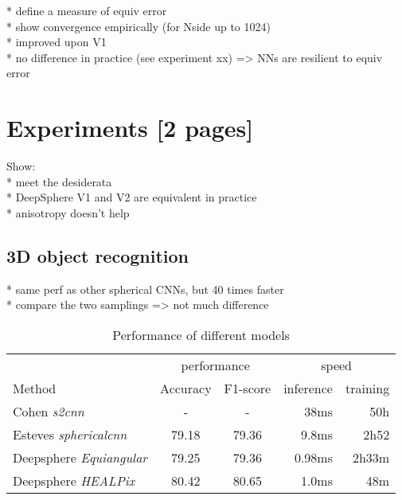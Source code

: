 \documentclass{article} %
\begin{document}
* define a measure of equiv error\\
* show convergence empirically (for Nside up to 1024) \\
* improved upon V1\\
* no difference in practice (see experiment xx) => NNs are resilient to equiv error\\

\section{Experiments [2 pages]}

Show: \\
* meet the desiderata \\
* DeepSphere V1 and V2 are equivalent in practice \\
* anisotropy doesn't help \\

\subsection{3D object recognition}

* same perf as other spherical CNNs, but 40 times faster \\
* compare the two samplings => not much difference \\

\begin{table}[ht]
    \centering
    \begin{tabular}{l|c c r r}
        \multicolumn{1}{l}{} & \multicolumn{2}{c}{performance} & \multicolumn{2}{c}{speed}\\
        \cmidrule(lr){2-3} \cmidrule(lr){5-6}
        \multicolumn{1}{l}{Method} & Accuracy & F1-score & inference & training \\ \hline
        Cohen \emph{s2cnn} & - & - & 38ms & 50h\\
        Esteves \emph{sphericalcnn} & 79.18 & 79.36 & 9.8ms & 2h52\\ \hline
        Deepsphere \emph{Equiangular} & 79.25 & 79.36 & 0.98ms & 2h33m \\
        Deepsphere \emph{HEALPix} & 80.42 & 80.65 & 1.0ms & 48m
    \end{tabular}
    \caption{Performance of different models}
    \label{tab:SHREC17_class}
\end{table}
\end{document}
